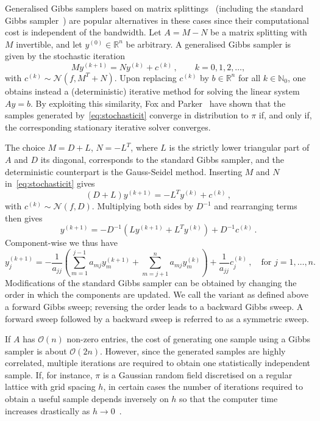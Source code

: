 \documentclass[
fontsize=11pt,
paper=a4,
numbers=noenddot
]{scrartcl}
\begin{document}
Generalised Gibbs samplers based on matrix splittings~\cite{foxparker} (including the standard Gibbs sampler~\cite{gemangeman}) are popular alternatives in these cases since their computational cost is independent of the bandwidth. Let $A = M - N$ be a matrix splitting with $M$ invertible, and let $y^{(0)} \in \mathbb{R}^n$ be arbitrary. A generalised Gibbs sampler is given by the stochastic iteration
\begin{equation}
    \label{eq:stochasticit}
    M y^{(k+1)} = N y^{(k)} + c^{(k)}\,,\qquad k = 0,1,2, \dotsc,
\end{equation}
with $c^{(k)} \sim \mathcal{N}(f, M^T + N)$. Upon replacing $c^{(k)}$ by $b \in \mathbb{R}^n$ for all $k \in \mathbb{N}_0$, one obtains instead a (deterministic) iterative method for solving the linear system $Ay=b$. By exploiting this similarity, Fox and Parker~\cite{foxparker} have shown that the samples generated by~\eqref{eq:stochasticit} converge in distribution to $\pi$ if, and only if, the corresponding stationary iterative solver converges.

The choice $M = D + L$, $N = -L^T$, where $L$ is the strictly lower triangular part of $A$ and $D$ its diagonal, corresponds to the standard Gibbs sampler, and the deterministic counterpart is the Gauss-Seidel method. Inserting $M$ and $N$ in~\eqref{eq:stochasticit} gives
\begin{equation*}
    \left(D + L\right) y^{(k+1)} = - L^T y^{(k)} + c^{(k)}\,,
\end{equation*}
with $c^{(k)} \sim \mathcal{N}(f,D)$. Multiplying both sides by $D^{-1}$ and rearranging terms then gives
\begin{equation*}
    y^{(k+1)} = - D^{-1} (L y^{(k+1)} + L^T y^{(k)}) + D^{-1} c^{(k)}\,.
\end{equation*}
Component-wise we thus have
\begin{equation}
    \label{eq:gibbs_comp}
    y^{(k+1)}_j = - \frac{1}{a_{jj}} \left(
      \sum_{m=1}^{j-1} a_{mj} y^{(k+1)}_m + \sum_{m=j+1}^n a_{mj} y^{(k)}_m
    \right) + \frac{1}{a_{jj}} c^{(k)}_j \,,\quad \text{for $j=1,\dotsc,n$.}
\end{equation}
Modifications of the standard Gibbs sampler can be obtained by changing the order in which the components are updated. We call the variant as defined above a forward Gibbs sweep; reversing the order leads to a backward Gibbs sweep. A forward sweep followed by a backward sweep is referred to as a symmetric sweep.  

If $A$ has $\mathcal{O}(n)$ non-zero entries, the cost of generating one sample using a Gibbs sampler is about $\mathcal{O}(2n)$. However, since the generated samples are highly correlated, multiple iterations are required to obtain one statistically independent sample. If, for instance, $\pi$ is a Gaussian random field discretised on a regular lattice with grid spacing $h$, in certain cases the number of iterations required to obtain a useful sample depends inversely on $h$ so that the computer time increases drastically as $h \rightarrow 0$~\cite{goodmansokal,kazashimuellerscheichl}.
\end{document}

